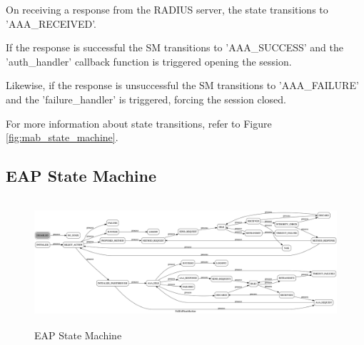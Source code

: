 On receiving a response from the RADIUS server, the state transitions to 'AAA\_RECEIVED'. 

If the response is successful the SM transitions to 'AAA\_SUCCESS' and the 'auth\_handler' callback function is triggered opening the session. 

Likewise, if the response is unsuccessful the SM transitions to 'AAA\_FAILURE' and the 'failure\_handler' is triggered, forcing the session closed.

For more information about state transitions, refer to Figure \ref{fig:mab_state_machine}.

\subsection{EAP State Machine}
\begin{figure}\begin{center}
    \includegraphics[height=4.7cm]{images/eap_state_machine.png}
    \caption{EAP State Machine}
    \label{fig:eap_state_machine}
\end{center}\end{figure}

